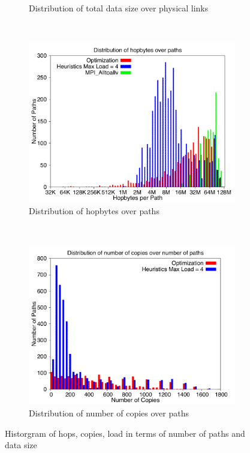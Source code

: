 \begin{figure}[!htbp]
\begin{subfigure}[b]{0.49\textwidth}
                \caption{Distribution of total data size over physical links}
                \label{fig:3_2048_loaddata}
        \end{subfigure}
        ~ %
        \begin{subfigure}[b]{0.49\textwidth}
                \includegraphics[width=\textwidth]{report_figures/constantr/3_2048/hopbyte_histo.pdf}
                \caption{Distribution of hopbytes over paths}
                \label{fig:3_2048_hopbyte}
        \end{subfigure}
        ~ %
        \begin{subfigure}[b]{0.49\textwidth}
                \includegraphics[width=\textwidth]{report_figures/constantr/3_2048/hopcopy_histo.pdf}
                \caption{Distribution of number of copies over paths}
                \label{fig:3_2048_hopcopy}
        \end{subfigure}
        \caption{Historgram of hops, copies, load in terms of number of paths and data size}
        \label{fig:3_2048_histo}
\end{figure}

